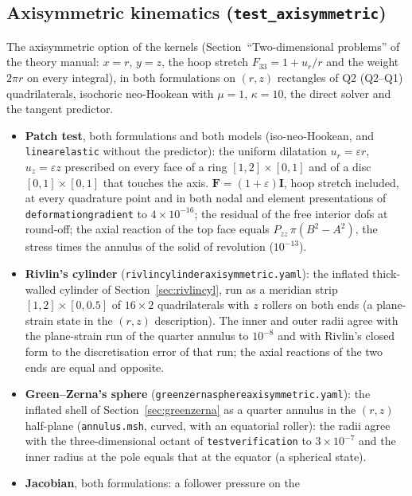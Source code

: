 \documentclass[11pt]{article}
\newcommand{\bF}{\bm{F}}
\newcommand{\bI}{\bm{I}}
\DeclareRobustCommand{\code}[1]{{\def\_{\textunderscore\allowbreak}\texttt{#1}}}
\DeclareRobustCommand{\file}[1]{{\def\_{\textunderscore\allowbreak}\texttt{#1}}}
\begin{document}
\subsection{Axisymmetric kinematics (\texttt{test\_axisymmetric})}
\label{sec:testaxi}
The axisymmetric option of the kernels (Section~``Two-dimensional
problems'' of the theory manual: $x = r$, $y = z$, the hoop stretch
$F_{33} = 1 + u_r/r$ and the weight $2\pi r$ on every integral), in both
formulations on $(r, z)$ rectangles of Q2 (Q2--Q1) quadrilaterals, isochoric
neo-Hookean with $\mu = 1$, $\kappa = 10$, the direct solver and the tangent
predictor.
\begin{itemize}[nosep]
  \item \textbf{Patch test}, both formulations and both models
    (iso-neo-Hookean, and \code{linear\_elastic} without the predictor): the
    uniform dilatation $u_r = \varepsilon r$, $u_z = \varepsilon z$
    prescribed on every face of a ring $[1, 2]\times[0, 1]$ and of a disc
    $[0, 1]\times[0, 1]$ that touches the axis.  $\bF = (1 + \varepsilon)\bI$,
    hoop stretch included, at every quadrature point and in both nodal and
    element presentations of \code{deformation\_gradient} to $4\times10^{-16}$;
    the residual of the free interior dofs at round-off; the axial reaction of
    the top face equals $P_{zz}\,\pi(B^2 - A^2)$, the stress times the
    annulus of the solid of revolution ($10^{-13}$).
  \item \textbf{Rivlin's cylinder} (\file{rivlin\_cylinder\_axisymmetric.yaml}):
    the inflated thick-walled cylinder of Section~\ref{sec:rivlincyl}, run as a
    meridian strip $[1, 2]\times[0, 0.5]$ of $16\times2$ quadrilaterals with
    $z$ rollers on both ends (a plane-strain state in the $(r, z)$ description).
    The inner and outer radii agree with the plane-strain run of the
    quarter annulus to $10^{-8}$ and with Rivlin's closed form to the
    discretisation error of that run; the axial reactions of the two ends are
    equal and opposite.
  \item \textbf{Green--Zerna's sphere} (\file{green\_zerna\_sphere\_axisymmetric.yaml}):
    the inflated shell of Section~\ref{sec:greenzerna} as a quarter annulus
    in the $(r, z)$ half-plane (\file{annulus.msh}, curved, with an
    equatorial roller): the radii agree with the three-dimensional octant of
    \file{test\_verification} to $3\times10^{-7}$ and the inner radius at the
    pole equals that at the equator (a spherical state).
  \item \textbf{Jacobian}, both formulations: a follower pressure on the

\end{itemize}
\end{document}

